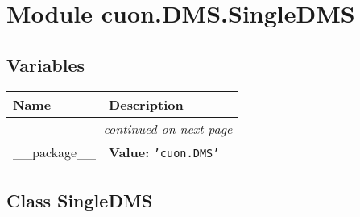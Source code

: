 %
%
%


\section{Module cuon.DMS.SingleDMS}

    \label{cuon:DMS:SingleDMS}


  \subsection{Variables}

    \vspace{-1cm}
\hspace{\varindent}\begin{longtable}{|p{\varnamewidth}|p{\vardescrwidth}|l}
\cline{1-2}
\cline{1-2} \centering \textbf{Name} & \centering \textbf{Description}& \\
\cline{1-2}
\endhead\cline{1-2}\multicolumn{3}{r}{\small\textit{continued on next page}}\\\endfoot\cline{1-2}
\endlastfoot\raggedright \_\-\_\-p\-a\-c\-k\-a\-g\-e\-\_\-\_\- & \raggedright \textbf{Value:} 
{\tt \texttt{'}\texttt{cuon.DMS}\texttt{'}}&\\
\cline{1-2}
\end{longtable}



\subsection{Class SingleDMS}

